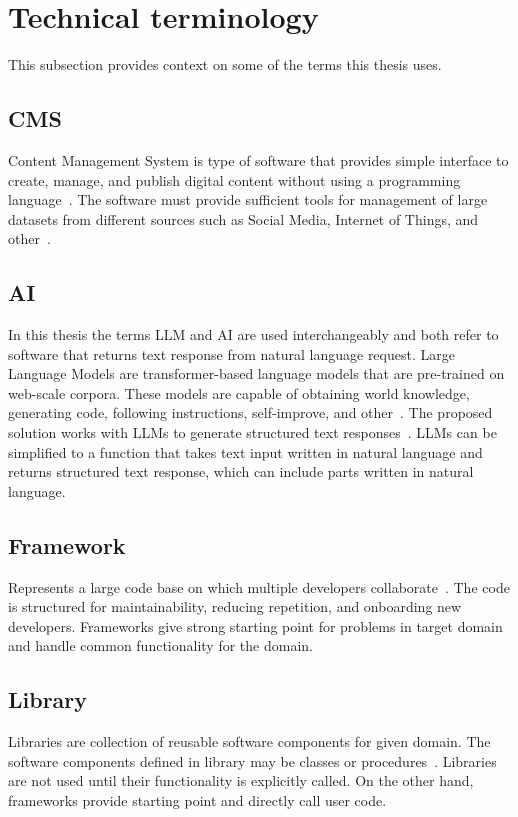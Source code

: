 \section{Technical terminology}\label{sec:techical-research}
This subsection provides context on some of the terms this thesis uses.

\subsection*{CMS}
Content Management System is type of software that provides simple interface to create, manage, and publish digital
content without using a programming language~\parencite{oracle_cms}.
The software must provide sufficient tools for management of large datasets from different sources such as Social Media,
Internet of Things, and other~\parencite{kandepu_cms}.

\subsection*{AI}
In this thesis the terms LLM and AI are used interchangeably and both refer to software that returns text response from natural language request.
Large Language Models are transformer-based language models that are pre-trained on web-scale corpora.
These models are capable of obtaining world knowledge, generating code, following instructions, self-improve, and other~\parencite{minaee2025_llm_suvey}.
The proposed solution works with LLMs to generate structured text responses~\parencite{cloudflare_llm}.
LLMs can be simplified to a function that takes text input written in natural language and returns structured text response,
which can include parts written in natural language.

\subsection*{Framework}
Represents a large code base on which multiple developers collaborate~\parencite[6]{rahman2011}.
The code is structured for maintainability, reducing repetition, and onboarding new developers.
Frameworks give strong starting point for problems in target domain and handle common functionality for the domain.

\subsection*{Library}
Libraries are collection of reusable software components for given domain.
The software components defined in library may be classes or procedures~\parencite[sec.~2.2, p.~8]{wegner1990}.
Libraries are not used until their functionality is explicitly called.
On the other hand, frameworks provide starting point and directly call user code.

